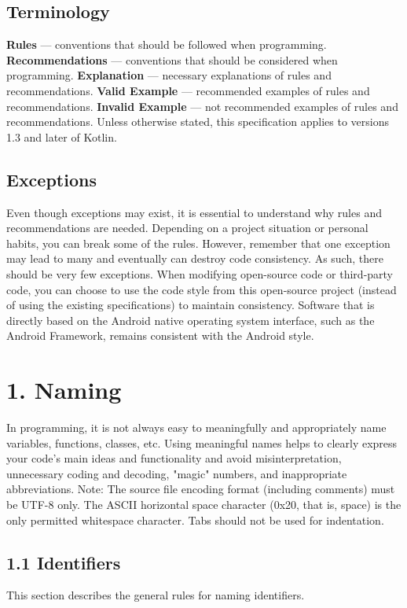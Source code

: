 \subsection*{\textbf{Terminology}}
\textbf{Rules} — conventions that should be followed when programming.
\textbf{Recommendations} — conventions that should be considered when programming.
\textbf{Explanation} — necessary explanations of rules and recommendations.
\textbf{Valid Example} — recommended examples of rules and recommendations.
\textbf{Invalid Example} — not recommended examples of rules and recommendations.
Unless otherwise stated, this specification applies to versions 1.3 and later of Kotlin.
\subsection*{\textbf{Exceptions}}
Even though exceptions may exist, it is essential to understand why rules and recommendations are needed.
Depending on a project situation or personal habits, you can break some of the rules. However, remember that one exception may lead to many and eventually can destroy code consistency. As such, there should be very few exceptions.
When modifying open-source code or third-party code, you can choose to use the code style from this open-source project (instead of using the existing specifications) to maintain consistency.
Software that is directly based on the Android native operating system interface, such as the Android Framework, remains consistent with the Android style.
\section*{\textbf{1. Naming}}
\label{sec:1.}
In programming, it is not always easy to meaningfully and appropriately name variables, functions, classes, etc. Using meaningful names helps to clearly express your code's main ideas and functionality and avoid misinterpretation, unnecessary coding and decoding, "magic" numbers, and inappropriate abbreviations.
Note: The source file encoding format (including comments) must be UTF-8 only. The ASCII horizontal space character (0x20, that is, space) is the only permitted whitespace character. Tabs should not be used for indentation.
\subsection*{\textbf{1.1 Identifiers}}
\label{sec:1.1}
This section describes the general rules for naming identifiers.
